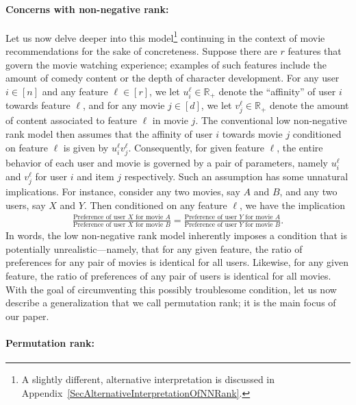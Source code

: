 \documentclass[11pt, hidelinks]{article} %
\newcommand{\arxiv}[1]{#1}
\newcommand{\reals}{\ensuremath{\mathbb{R}}}
\newcommand{\numrows}{n}
\newcommand{\numcols}{d}
\newcommand{\nnrank}{r}
\newcommand{\lowLeftVec}[1]{u^{#1}}
\newcommand{\lowRightVec}[1]{v^{#1}}
\begin{document}
\paragraph{Concerns with non-negative rank:}  
Let us now delve deeper into this model\arxiv{\footnote{A slightly
    different, alternative interpretation is discussed in
    Appendix~\ref{SecAlternativeInterpretationOfNNRank}.}}  continuing
in the context of movie recommendations for the sake of
concreteness. Suppose there are $\nnrank$ features that govern the
movie watching experience; examples of such features include the
amount of comedy content or the depth of character development. For
any user $i \in [\numrows]$ and any feature $\ell \in [\nnrank]$, we
let $\lowLeftVec{\ell}_i \in \reals_+$ denote the ``affinity'' of user
$i$ towards feature $\ell$, and for any movie $j \in [\numcols]$, we
let $\lowRightVec{\ell}_j \in \reals_+$ denote the amount of content
associated to feature $\ell$ in movie $j$. The conventional low
non-negative rank model then assumes that the affinity of user $i$
towards movie $j$ conditioned on feature $\ell$ is given by
$\lowLeftVec{\ell}_i \lowRightVec{\ell}_j$.  Consequently, for given
feature $\ell$, the entire behavior of each user and movie is governed
by a pair of parameters, namely $\lowLeftVec{\ell}_i$ and
$\lowRightVec{\ell}_j$ for user $i$ and item $j$ respectively. Such an
assumption has some unnatural implications. For instance, consider any
two movies, say $A$ and $B$, and any two users, say $X$ and $Y$. Then
conditioned on any feature $\ell$, we have the implication
\begin{align*}
\frac{\text{Preference of user $X$ for movie $A$}}{\text{Preference of user $X$ for movie $B$}} = \frac{\text{Preference of user $Y$ for movie $A$}}{\text{Preference of user $Y$ for movie $B$}}.
\end{align*}
In words, the low non-negative rank model inherently imposes a
condition that is potentially unrealistic---namely, that for any given
feature, the ratio of preferences for any pair of movies is identical
for all users. Likewise, for any given feature, the ratio of
preferences of any pair of users is identical for all movies.  With
the goal of circumventing this possibly troublesome condition, let us
now describe a generalization that we call permutation rank; it is the
main focus of our paper.


\paragraph*{Permutation rank:} 
\end{document}
